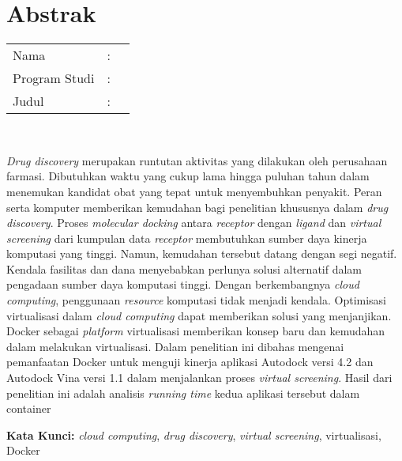 %
%
%

\chapter*{Abstrak}

\vspace*{0.2cm}

\noindent \begin{tabular}{l l p{10cm}}
	Nama&: & \penulis \\
	Program Studi&: & \program \\
	Judul&: & \judul \\
\end{tabular} \\ 

\vspace*{0.5cm}

\noindent \textit{Drug discovery} merupakan runtutan aktivitas yang dilakukan oleh perusahaan farmasi. Dibutuhkan waktu yang cukup lama hingga puluhan tahun dalam menemukan kandidat obat yang tepat untuk menyembuhkan penyakit. Peran serta komputer memberikan kemudahan bagi penelitian khususnya dalam \textit{drug discovery}. Proses \textit{molecular docking} antara \textit{receptor} dengan \textit{ligand} dan \textit{virtual screening} dari kumpulan data \textit{receptor} membutuhkan sumber daya kinerja komputasi yang tinggi. Namun, kemudahan tersebut datang dengan segi negatif. Kendala fasilitas dan dana menyebabkan perlunya solusi alternatif dalam pengadaan sumber daya komputasi tinggi. Dengan berkembangnya \textit{cloud computing}, penggunaan \textit{resource} komputasi tidak menjadi kendala. Optimisasi virtualisasi dalam \textit{cloud computing} dapat memberikan solusi yang menjanjikan. Docker sebagai \textit{platform} virtualisasi memberikan konsep baru dan kemudahan dalam melakukan virtualisasi. Dalam penelitian ini dibahas mengenai pemanfaatan Docker untuk menguji kinerja aplikasi Autodock versi 4.2 dan Autodock Vina versi 1.1 dalam menjalankan proses \textit{virtual screening}. Hasil dari penelitian ini adalah analisis \textit{running time} kedua aplikasi tersebut dalam container



\vspace*{0.2cm}

\noindent \textbf{Kata Kunci:} \textit{cloud computing}, \textit{drug discovery}, \textit{virtual screening}, virtualisasi, Docker

\newpage